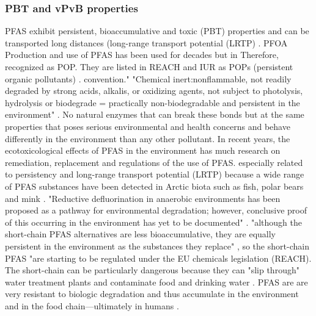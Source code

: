 \subsubsection{PBT and vPvB properties}
PFAS exhibit persistent, bioaccumulative and toxic (PBT) properties and can be transported long distances (long-range transport potential (LRTP) \citep{EC2020PFAS,MD2016workshop}. PFOA Production and use of PFAS has been used for decades but in  Therefore, recognized as POP.  They are listed in REACH and IUR as POPs (persistent organic pollutants) \citep{Schlabach2017}.   
convention." \citep{Schlabach2017} "Chemical inert:nonflammable, not readily degraded by strong acids, alkalis, or oxidizing agents, not subject to photolysis, hydrolysis or biodegrade  = practically non-biodegradable and persistent in the environment" \citep{Lau2007,EPA2014}. No natural enzymes that can break these bonds
but at the same properties that poses serious environmental and health concerns and behave differently in the environment than any other pollutant. In recent years, the ecotoxicological effects of PFAS in the environment has much research on remediation, replacement and regulations of the use of PFAS. especially related to persistency and long-range transport potential (LRTP) \citep{MD2020EQS} because a wide range of PFAS substances have been detected in Arctic biota such as fish, polar bears and mink \citep{Schlabach2017}. 
"Reductive defluorination in anaerobic environments has been proposed as a pathway for environmental degradation; however, conclusive proof of this occurring in the environment has yet to be documented" \citep{ArpNGI}.
"although the short-chain PFAS alternatives are less bioaccumulative, they are equally persistent in the environment as the substances they replace" \citep{ECHA2020}, so the short-chain PFAS "are starting to be regulated under the EU chemicals legislation (REACH). The short-chain can be particularly dangerous because they can "slip through" water treatment plants and contaminate food and drinking water \citep{Reemtsma2016}. PFAS are are very resistant to biologic degradation and thus accumulate in the environment and in the food chain---ultimately in humans \citep{Schlabach2017,Steenland2010,Lau2007}. 

